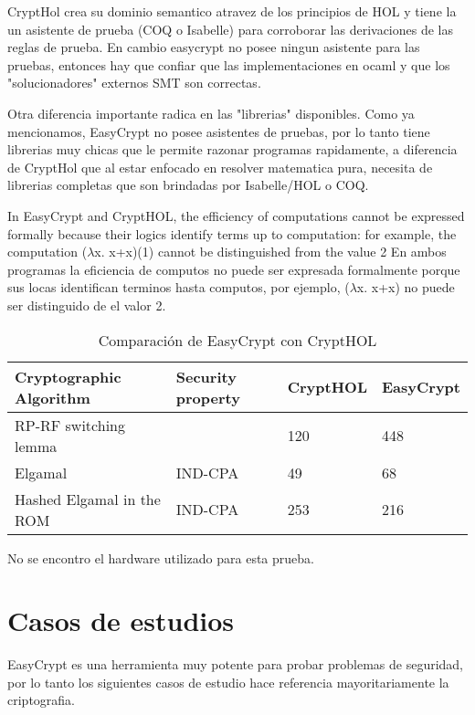\documentclass[runningheads,a4paper]{llncs}
\begin{document}
CryptHol crea su dominio semantico atravez de los principios de HOL y tiene la un asistente de prueba (COQ o Isabelle) para corroborar las derivaciones de las reglas de prueba. En cambio easycrypt no posee ningun asistente para las pruebas, entonces hay que confiar que las implementaciones en ocaml y que los "solucionadores" externos SMT son correctas.

Otra diferencia importante radica en las "librerias" disponibles. Como ya mencionamos, EasyCrypt no posee asistentes de pruebas, por lo tanto tiene librerias muy chicas que le permite razonar programas rapidamente, a diferencia de CryptHol que al estar enfocado en resolver matematica pura, necesita de librerias completas que son brindadas por Isabelle/HOL o COQ.

In EasyCrypt and CryptHOL, the efficiency of computations
cannot be expressed formally because their logics identify terms up to computation:
for example, the computation ($\lambda$x. x+x)(1) cannot be distinguished from the value 2
En ambos programas la eficiencia de computos no puede ser expresada formalmente porque sus locas identifican terminos hasta computos, por ejemplo, ($\lambda$x. x+x) no puede ser distinguido de el valor 2.\cite{article8}

\begin{table}
  \caption{Comparación de EasyCrypt con CryptHOL}
  \label{tab:simple2}
  \centering
  \begin{tabular}{ |p{4cm}|p{1.5cm}|p{1.5cm}|p{1.5cm}|  }
 \hline
 Cryptographic Algorithm & Security property & CryptHOL & EasyCrypt\\\cline{1-4}
 \hline
 RP-RF switching lemma &  & 120 & 448\\
 Elgamal & IND-CPA & 49  & 68\\
 Hashed Elgamal in the ROM & IND-CPA & 253 &  216\\
 \hline
\end{tabular}
\end{table}


No se encontro el hardware utilizado para esta prueba.




\section{Casos de estudios}
EasyCrypt es una herramienta muy potente para probar problemas de seguridad, por lo tanto los siguientes casos de estudio hace referencia mayoritariamente la criptografia.
\end{document}
